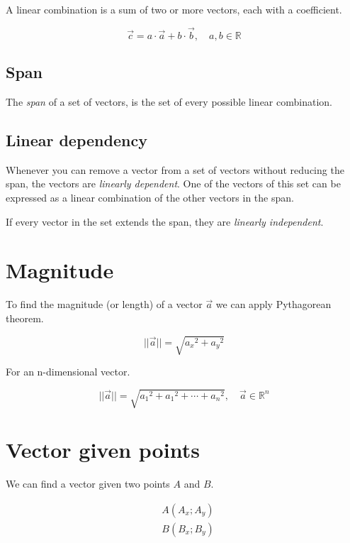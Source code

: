\documentclass[a4paper]{article}
\begin{document}
A linear combination is a sum of two or more vectors, each with a coefficient.

\[
    \vec{c} = a \cdot\vec{a} + b\cdot\vec{b},
    \quad a,b\in \mathbb{R}
\]

\subsection{Span}

The \textit{span} of a set of vectors, is the set of every possible linear combination.

\subsection{Linear dependency}

Whenever you can remove a vector from a set of vectors without reducing the span,
the vectors are \textit{linearly dependent}.
One of the vectors of this set can be expressed as a linear combination of the other vectors in the span.



If every vector in the set extends the span, they are \textit{linearly independent}.

\section{Magnitude}

To find the magnitude (or length) of a vector \(\vec{a}\) we can apply Pythagorean theorem.

\[
    ||\vec{a}|| = \sqrt{{a_x}^2 + {a_y}^2}
\]

For an n-dimensional vector.

\[
    ||\vec{a}|| = \sqrt{{a_1}^2 + {a_1}^2 + \cdots + {a_n}^2},
    \quad \vec{a}\in\mathbb{R}^n
\]

\section{Vector given points}

We can find a vector given two points \(A\) and \(B\).

\begin{align*}
    &A(A_x; A_y) \\
    &B(B_x; B_y)
\end{align*}
\end{document}
